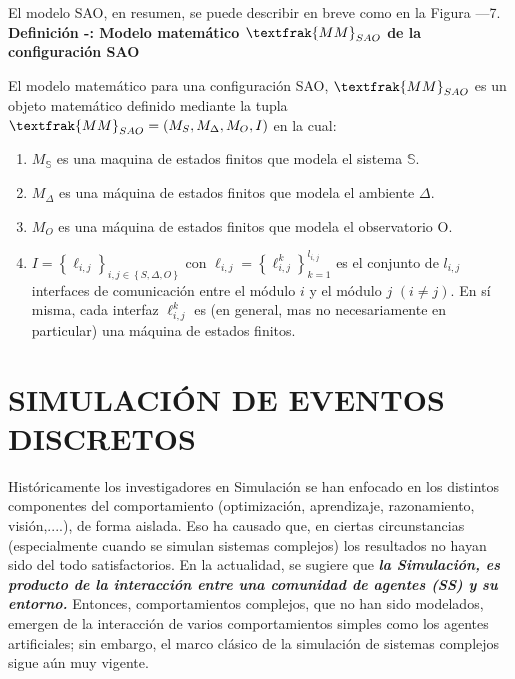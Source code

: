 El modelo SAO, en resumen, se puede describir en breve como en la Figura —7.\\

\textbf{Definición -: Modelo matemático $\textfrak{MM}_{SAO}$ de la configuración SAO }\\

El modelo matemático para una configuración SAO, $\textfrak{MM}_{SAO}$ es un objeto matemático definido mediante la tupla $\textfrak{MM}_{SAO}=(M_S,M_\Delta,M_O,I)$ en la cual:\\

\begin{enumerate}
    \item \textit{$M_{\mathbb{S}}$} es una maquina de estados finitos que modela el sistema $\mathbb{S}$.
    \item \textit{$M_\Delta$} es una máquina de estados finitos que modela el ambiente $\Delta$.
    \item \textit{$M_O$} es una máquina de estados finitos que modela el observatorio O.
    \item \textit{$I= \left\lbrace \ell_{i,j} \right\rbrace_{i,j \in \left\lbrace S, \Delta, O \right\rbrace}$} con $\ell_{i,j} = \left\lbrace \ell_{i,j}^k \right\rbrace_{k=1}^{l_{i,j}}$ es el conjunto de $l_{i,j}$ interfaces de comunicación entre el módulo $i$ y el módulo $j$ $(i \neq j)$. En sí misma, cada interfaz $\ell_{i,j}^k$ es (en general, mas no necesariamente en particular) una máquina de estados finitos.
\end{enumerate}


\section{SIMULACIÓN DE EVENTOS DISCRETOS}\label{sec:SimulEventDiscret}

Históricamente los investigadores en Simulación se han enfocado en los distintos componentes del comportamiento (optimización, aprendizaje, razonamiento, visión,....), de forma aislada. Eso ha causado que, en ciertas circunstancias (especialmente cuando se simulan sistemas complejos) los resultados no hayan sido del todo satisfactorios. En la actualidad, se sugiere \cite{trivino2012esthocasticModels} que \textbf{\textit{la Simulación, es producto de la interacción entre una comunidad de agentes (SS) y su entorno.}} Entonces, comportamientos complejos, que no han sido modelados, emergen de la interacción de varios comportamientos simples como los agentes artificiales; sin embargo, el marco clásico de la simulación de sistemas complejos sigue aún muy vigente.\\

